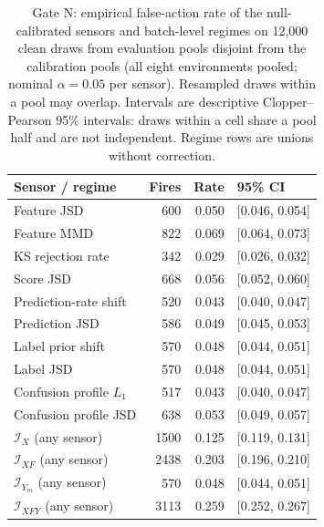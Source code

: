\begin{table}[!t]
\caption{Gate N: empirical false-action rate of the null-calibrated sensors and batch-level regimes on 12,000 clean draws from evaluation pools disjoint from the calibration pools (all eight environments pooled; nominal $\alpha=0.05$ per sensor). Resampled draws within a pool may overlap. Intervals are descriptive Clopper--Pearson 95\% intervals: draws within a cell share a pool half and are not independent. Regime rows are unions without correction.}
\label{tab:s-fpr}
\centering
\footnotesize
\setlength{\tabcolsep}{4pt}
\begin{tabular}{@{}lrrl@{}}
\toprule
Sensor / regime & Fires & Rate & 95\% CI \\
\midrule
Feature JSD & 600 & 0.050 & [0.046, 0.054] \\
Feature MMD & 822 & 0.069 & [0.064, 0.073] \\
KS rejection rate & 342 & 0.029 & [0.026, 0.032] \\
Score JSD & 668 & 0.056 & [0.052, 0.060] \\
Prediction-rate shift & 520 & 0.043 & [0.040, 0.047] \\
Prediction JSD & 586 & 0.049 & [0.045, 0.053] \\
Label prior shift & 570 & 0.048 & [0.044, 0.051] \\
Label JSD & 570 & 0.048 & [0.044, 0.051] \\
Confusion profile $L_1$ & 517 & 0.043 & [0.040, 0.047] \\
Confusion profile JSD & 638 & 0.053 & [0.049, 0.057] \\
\midrule
$\mathcal I_X$ (any sensor) & 1500 & 0.125 & [0.119, 0.131] \\
$\mathcal I_{XF}$ (any sensor) & 2438 & 0.203 & [0.196, 0.210] \\
$\mathcal I_{Y_m}$ (any sensor) & 570 & 0.048 & [0.044, 0.051] \\
$\mathcal I_{XFY}$ (any sensor) & 3113 & 0.259 & [0.252, 0.267] \\
\bottomrule
\end{tabular}
\end{table}
